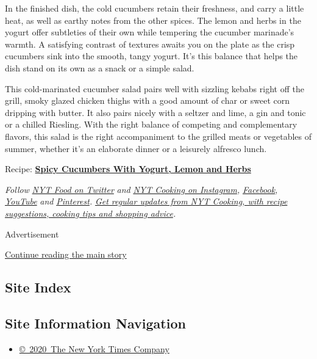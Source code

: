In the finished dish, the cold cucumbers retain their freshness, and
carry a little heat, as well as earthy notes from the other spices. The
lemon and herbs in the yogurt offer subtleties of their own while
tempering the cucumber marinade's warmth. A satisfying contrast of
textures awaits you on the plate as the crisp cucumbers sink into the
smooth, tangy yogurt. It's this balance that helps the dish stand on its
own as a snack or a simple salad.

This cold-marinated cucumber salad pairs well with sizzling kebabs right
off the grill, smoky glazed chicken thighs with a good amount of char or
sweet corn dripping with butter. It also pairs nicely with a seltzer and
lime, a gin and tonic or a chilled Riesling. With the right balance of
competing and complementary flavors, this salad is the right
accompaniment to the grilled meats or vegetables of summer, whether it's
an elaborate dinner or a leisurely alfresco lunch.

Recipe:
\textbf{\href{https://cooking.nytimes.com/recipes/1021278-spicy-cucumbers-with-yogurt-lemon-and-herbs}{Spicy
Cucumbers With Yogurt, Lemon and Herbs}}

\emph{Follow} \href{https://twitter.com/nytfood}{\emph{NYT Food on
Twitter}} \emph{and}
\href{https://www.instagram.com/nytcooking/}{\emph{NYT Cooking on
Instagram}}\emph{,}
\href{https://www.facebook.com/nytcooking/}{\emph{Facebook}}\emph{,}
\href{https://www.youtube.com/nytcooking}{\emph{YouTube}} \emph{and}
\href{https://www.pinterest.com/nytcooking/}{\emph{Pinterest}}\emph{.}
\href{https://www.nytimes.com/newsletters/cooking}{\emph{Get regular
updates from NYT Cooking, with recipe suggestions, cooking tips and
shopping advice}}\emph{.}

Advertisement

\protect\hyperlink{after-bottom}{Continue reading the main story}

\hypertarget{site-index}{%
\subsection{Site Index}\label{site-index}}

\hypertarget{site-information-navigation}{%
\subsection{Site Information
Navigation}\label{site-information-navigation}}

\begin{itemize}
\tightlist
\item
  \href{https://help.nytimes.com/hc/en-us/articles/115014792127-Copyright-notice}{©~2020~The
  New York Times Company}
\end{itemize}


